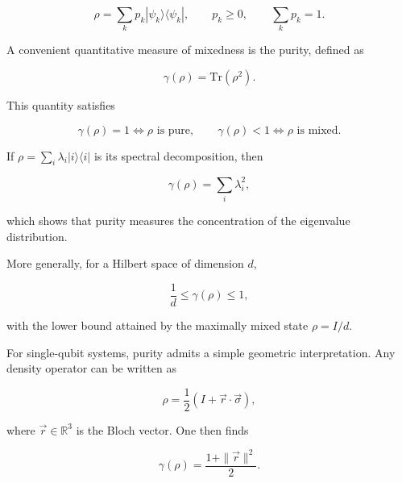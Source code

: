 \begin{equation}
\rho
=
\sum_k
p_k
|\psi_k\rangle\langle\psi_k|,
\qquad
p_k \ge 0,
\qquad
\sum_k p_k = 1.
\label{eq:mixed_density_operator}
\end{equation}

\medskip

A convenient quantitative measure of mixedness is the purity, defined as

\begin{equation}
\gamma(\rho)
=
\mathrm{Tr}(\rho^2).
\label{eq:purity_definition}
\end{equation}

This quantity satisfies

\begin{equation}
\gamma(\rho)=1
\Longleftrightarrow
\rho \text{ is pure},
\qquad
\gamma(\rho)<1
\Longleftrightarrow
\rho \text{ is mixed}.
\label{eq:purity_pure_mixed_condition}
\end{equation}

\medskip

If \( \rho = \sum_i \lambda_i |i\rangle\langle i| \) is its spectral decomposition, then

\begin{equation}
\gamma(\rho)
=
\sum_i \lambda_i^2,
\label{eq:purity_spectral_decomposition}
\end{equation}

which shows that purity measures the concentration of the eigenvalue distribution.

More generally, for a Hilbert space of dimension \( d \),

\begin{equation}
\frac{1}{d}
\le
\gamma(\rho)
\le
1,
\label{eq:purity_bounds}
\end{equation}

with the lower bound attained by the maximally mixed state \( \rho = I/d \).

\medskip

For single-qubit systems, purity admits a simple geometric interpretation. Any density operator can be written as

\begin{equation}
\rho
=
\frac{1}{2}
\left(
I + \vec{r}\cdot\vec{\sigma}
\right),
\label{eq:single_qubit_bloch_representation}
\end{equation}

where \( \vec{r} \in \mathbb{R}^3 \) is the Bloch vector. One then finds

\begin{equation}
\gamma(\rho)
=
\frac{1+\|\vec{r}\|^2}{2}.
\label{eq:single_qubit_purity_bloch}
\end{equation}

